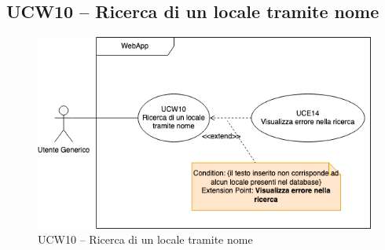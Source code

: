 \subsection{UCW10 – Ricerca di un locale tramite nome}
\begin{figure}[!h]
\centering
\includegraphics[scale=0.5]{UC_images/UCW10.png} 
\caption{UCW10 – Ricerca di un locale tramite nome}
\end{figure}
